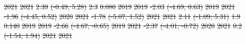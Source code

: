 \documentclass[
  letterpaper,
  DIV=11,
  numbers=noendperiod]{scrartcl}
\makeatletter
\renewenvironment{table}%
   {\renewcommand\familydefault\sfdefault
    \@float{table}}
   {\end@float}
\providecommand{\DIFdel}[1]{{\protect\color{red}\sout{#1}}}                      %
\providecommand{\DIFdelFL}[1]{\DIFdel{#1}} %
\makeatother
\begin{document}
\begin{table}
\DIFdelFL{\hspace{1em}2021 }%
\DIFdelFL{2021 }%
\DIFdelFL{2.39 }%
\DIFdelFL{(-0.49, 5.28) }%
\DIFdelFL{2.3 }%
\DIFdelFL{0.080}%
\DIFdelFL{\hspace{1em}2019 }%
\DIFdelFL{2019 }%
\DIFdelFL{-2.03 }%
\DIFdelFL{(-4.69, 0.63) }%
\DIFdelFL{\hspace{1em}2019 }%
\DIFdelFL{2021 }%
\DIFdelFL{-1.96 }%
\DIFdelFL{(-4.45, 0.52) }%
\DIFdelFL{\hspace{1em}2020 }%
\DIFdelFL{2021 }%
\DIFdelFL{-1.78 }%
\DIFdelFL{(-5.07, 1.52) }%
\DIFdelFL{\hspace{1em}2021 }%
\DIFdelFL{2021 }%
\DIFdelFL{2.11 }%
\DIFdelFL{(-1.09, 5.31) }%
\DIFdelFL{1.9 }%
\DIFdelFL{0.140}%
\DIFdelFL{\hspace{1em}2019 }%
\DIFdelFL{2019 }%
\DIFdelFL{-2.66 }%
\DIFdelFL{(-4.67, -0.65) }%
\DIFdelFL{\hspace{1em}2019 }%
\DIFdelFL{2021 }%
\DIFdelFL{-2.37 }%
\DIFdelFL{(-4.01, -0.72) }%
\DIFdelFL{\hspace{1em}2020 }%
\DIFdelFL{2021 }%
\DIFdelFL{0.2 }%
\DIFdelFL{(-1.54, 1.94) }%
\DIFdelFL{\hspace{1em}2021 }%
\DIFdelFL{2021 }%

\end{table}
\end{document}
